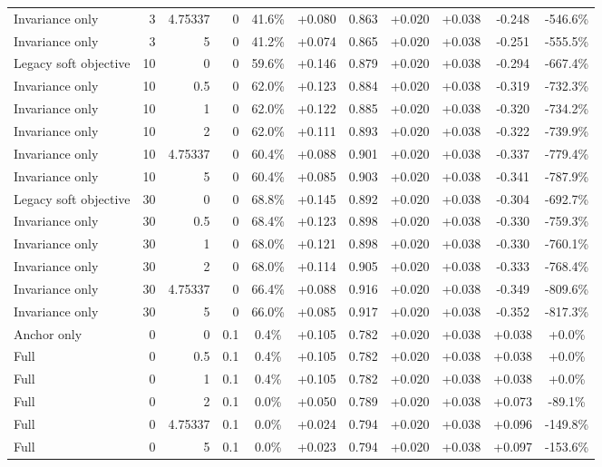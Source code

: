 \begin{table}[htbp]
\begin{tabular}{lrrrccccccc}
Invariance only & 3 & 4.75337 & 0 & 41.6\% & +0.080 & 0.863 & +0.020 & +0.038 & -0.248 & -546.6\% \\
Invariance only & 3 & 5 & 0 & 41.2\% & +0.074 & 0.865 & +0.020 & +0.038 & -0.251 & -555.5\% \\
Legacy soft objective & 10 & 0 & 0 & 59.6\% & +0.146 & 0.879 & +0.020 & +0.038 & -0.294 & -667.4\% \\
Invariance only & 10 & 0.5 & 0 & 62.0\% & +0.123 & 0.884 & +0.020 & +0.038 & -0.319 & -732.3\% \\
Invariance only & 10 & 1 & 0 & 62.0\% & +0.122 & 0.885 & +0.020 & +0.038 & -0.320 & -734.2\% \\
Invariance only & 10 & 2 & 0 & 62.0\% & +0.111 & 0.893 & +0.020 & +0.038 & -0.322 & -739.9\% \\
Invariance only & 10 & 4.75337 & 0 & 60.4\% & +0.088 & 0.901 & +0.020 & +0.038 & -0.337 & -779.4\% \\
Invariance only & 10 & 5 & 0 & 60.4\% & +0.085 & 0.903 & +0.020 & +0.038 & -0.341 & -787.9\% \\
Legacy soft objective & 30 & 0 & 0 & 68.8\% & +0.145 & 0.892 & +0.020 & +0.038 & -0.304 & -692.7\% \\
Invariance only & 30 & 0.5 & 0 & 68.4\% & +0.123 & 0.898 & +0.020 & +0.038 & -0.330 & -759.3\% \\
Invariance only & 30 & 1 & 0 & 68.0\% & +0.121 & 0.898 & +0.020 & +0.038 & -0.330 & -760.1\% \\
Invariance only & 30 & 2 & 0 & 68.0\% & +0.114 & 0.905 & +0.020 & +0.038 & -0.333 & -768.4\% \\
Invariance only & 30 & 4.75337 & 0 & 66.4\% & +0.088 & 0.916 & +0.020 & +0.038 & -0.349 & -809.6\% \\
Invariance only & 30 & 5 & 0 & 66.0\% & +0.085 & 0.917 & +0.020 & +0.038 & -0.352 & -817.3\% \\
Anchor only & 0 & 0 & 0.1 & 0.4\% & +0.105 & 0.782 & +0.020 & +0.038 & +0.038 & +0.0\% \\
Full & 0 & 0.5 & 0.1 & 0.4\% & +0.105 & 0.782 & +0.020 & +0.038 & +0.038 & +0.0\% \\
Full & 0 & 1 & 0.1 & 0.4\% & +0.105 & 0.782 & +0.020 & +0.038 & +0.038 & +0.0\% \\
Full & 0 & 2 & 0.1 & 0.0\% & +0.050 & 0.789 & +0.020 & +0.038 & +0.073 & -89.1\% \\
Full & 0 & 4.75337 & 0.1 & 0.0\% & +0.024 & 0.794 & +0.020 & +0.038 & +0.096 & -149.8\% \\
Full & 0 & 5 & 0.1 & 0.0\% & +0.023 & 0.794 & +0.020 & +0.038 & +0.097 & -153.6\% \\

\end{tabular}
\end{table}
